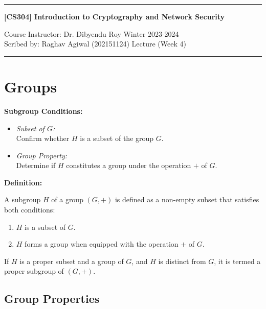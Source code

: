 \documentclass[11pt]{article}
\begin{document}
\noindent
\rule{\textwidth}{1pt}
\begin{center}
{\bf [CS304] Introduction to Cryptography and Network Security}
\end{center}
Course Instructor: Dr. Dibyendu Roy \hfill Winter 2023-2024\\
Scribed by: Raghav Agiwal (202151124) \hfill Lecture (Week 4)
\\
\rule{\textwidth}{1pt}
\section{Groups}

\textbf{Subgroup Conditions:}

\begin{itemize}
    \item \textit{Subset of $G$:} \\
    Confirm whether $H$ is a subset of the group $G$.
    
    \item \textit{Group Property:} \\
    Determine if $H$ constitutes a group under the operation $+$ of $G$.
\end{itemize}

\vspace{0.5cm}

\textbf{Definition:}

A subgroup $H$ of a group $(G, +)$ is defined as a non-empty subset that satisfies both conditions:
\begin{enumerate}
    \item $H$ is a subset of $G$.
    \item $H$ forms a group when equipped with the operation $+$ of $G$.
\end{enumerate}

If $H$ is a proper subset and a group of $G$, and $H$ is distinct from $G$, it is termed a proper subgroup of $(G, +)$.


\subsection{Group Properties}
\end{document}
